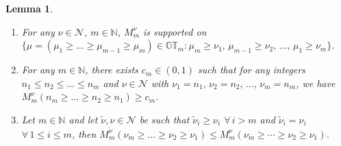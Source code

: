 \documentclass[pdftex]{sigma}
\numberwithin{equation}{section}
\newtheorem{lem}[thm]{Lemma}
\newcommand{\N}{\mathbb{N}}
\newcommand{\Nu}{\mathcal{N}}
\newcommand{\GT}{\mathbb{GT}}
\begin{document}
\begin{lem}\label{lem:posprob}\quad

\begin{enumerate}\itemsep=0pt
	\item[$1.$] For any $\nu\in\Nu$, $m\in\N$, $M_m^{\nu}$ is supported on $\{\mu = (\mu_1 \geq \dots \geq \mu_{m-1} \geq \mu_m) \in \GT_m\colon \mu_m \geq \nu_1,\, \mu_{m-1} \geq \nu_2, \, \dots,\, \mu_1 \geq \nu_m\}$.

	\item[$2.$] For any $m\in\N$, there exists $c_m \in (0, 1)$ such that for any integers $n_1 \leq n_2 \leq \dots \leq n_m$ and $\nu\in\Nu$ with $\nu_1 = n_1,\, \nu_2 = n_2,\, \dots,\, \nu_m = n_m$, we have $M^{\nu}_m(n_m \geq \dots \geq n_2 \geq n_1) \geq c_m$.

	\item[$3.$] Let $m\in\N$ and let $\widetilde{\nu}, \nu\in\Nu$ be such that $\widetilde{\nu}_i \geq \nu_i$ $\forall\, i > m$ and $\widetilde{\nu}_i = \nu_i$ $\forall\, 1\leq i\leq m$, then $M^{\widetilde{\nu}}_m(\nu_m \geq \dots \geq \nu_2 \geq \nu_1) \leq M^{\nu}_m(\nu_m \geq \cdots \geq \nu_2 \geq \nu_1)$.
\end{enumerate}
\end{lem}
\end{document}
